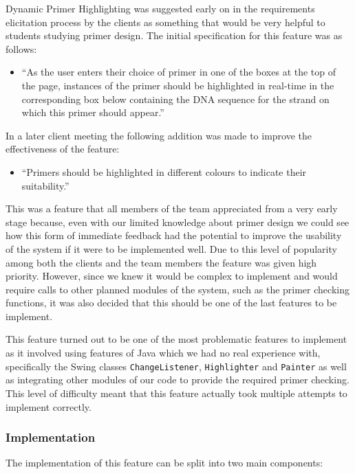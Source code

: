 
Dynamic Primer Highlighting was suggested early on in the requirements
elicitation process by the clients as something that would be very
helpful to students studying primer design. The initial specification
for this feature was as follows:

\begin{itemize}	
\item“As the user enters their choice of primer in one of the boxes at the
top of the page, instances of the primer should be highlighted in
real-time in the corresponding box below containing the DNA sequence for
the strand on which this primer should appear.”
\end{itemize}

In a later client meeting the following addition was made to improve the
effectiveness of the feature:

\begin{itemize}
\item“Primers should be highlighted in different colours to indicate their
suitability.”
\end{itemize}

This was a feature that all members of the team appreciated from a very early
stage because, even with our limited knowledge about primer design we
could see how this form of immediate feedback had the potential to
improve the usability of the system if it were to be implemented well.
Due to this level of popularity among both the clients and the team
members the feature was given high priority. However, since we knew it
would be complex to implement and would require calls to other planned
modules of the system, such as the primer checking functions, it was
also decided that this should be one of the last features to be
implement.

This feature turned out to be one of the most problematic features to
implement as it involved using features of Java which we had no real
experience with, specifically the Swing classes
\texttt{Change\-Listener}, \texttt{Highlighter} and \texttt{Painter} as
well as integrating other modules of our code to provide the required
primer checking. This level of difficulty meant that this feature
actually took multiple attempts to implement correctly.

\subsubsection{Implementation}

The implementation of this feature can be split into two main
components:

